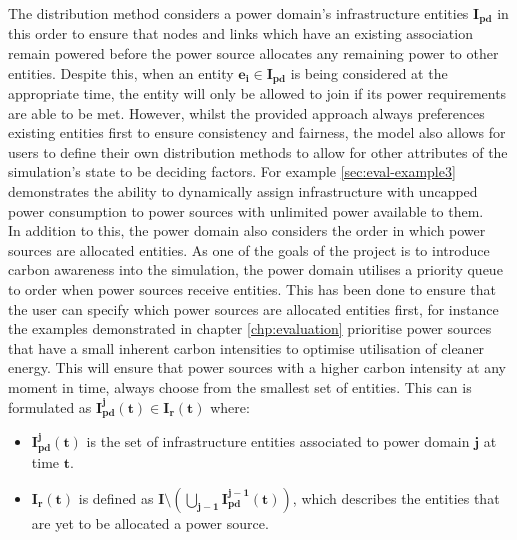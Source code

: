 \documentclass{l4proj}
\begin{document}
The distribution method considers a power domain's infrastructure entities $\mathbf{I_{pd}}$ in this order to ensure that nodes and links which have an existing association remain powered before the power source allocates any remaining power to other entities.
Despite this, when an entity $\mathbf{e_{i} \in I_{pd}}$ is being considered at the appropriate time, the entity will only be allowed to join if its power requirements are able to be met.
However, whilst the provided approach always preferences existing entities first to ensure consistency and fairness, the model also allows for users to define their own distribution methods to allow for other attributes of the simulation's state to be deciding factors.
For example \ref{sec:eval-example3} demonstrates the ability to dynamically assign infrastructure with uncapped power consumption to power sources with unlimited power available to them.\\

In addition to this, the power domain also considers the order in which power sources are allocated entities.
As one of the goals of the project is to introduce carbon awareness into the simulation, the power domain utilises a priority queue to order when power sources receive entities.
This has been done to ensure that the user can specify which power sources are allocated entities first, for instance the examples demonstrated in chapter \ref{chp:evaluation} prioritise power sources that have a small inherent carbon intensities to optimise utilisation of cleaner energy.
This will ensure that power sources with a higher carbon intensity at any moment in time, always choose from the smallest set of entities.
This can is formulated as $\mathbf{I_{pd}^j(t) \in I_{r}(t)}$ where:
\begin{itemize}
    \item $\mathbf{I_{pd}^j(t)}$ is the set of infrastructure entities associated to power domain $\mathbf{j}$ at time $\mathbf{t}$.\\
    \item $\mathbf{I_{r}(t)}$ is defined as $\mathbf{I \setminus \left( \bigcup_{j-1} I_{pd}^{j-1}(t) \right)}$, which describes the entities that are yet to be allocated a power source.
\end{itemize}
\end{document}
